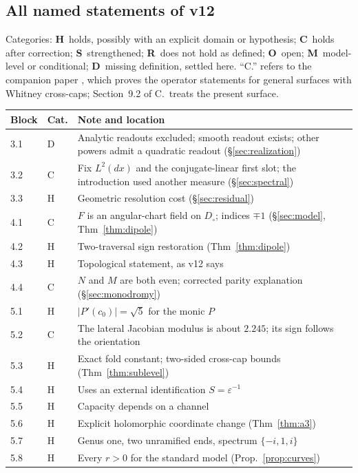 \documentclass[11pt]{article}
\theoremstyle{definition}\newtheorem{definition}[theorem]{Definition}
\theoremstyle{remark}\newtheorem{remark}[theorem]{Remark}
\begin{document}
\subsection{All named statements of v12}
Categories: \textbf{H}~holds, possibly with an explicit domain or hypothesis;
\textbf{C}~holds after correction; \textbf{S}~strengthened; \textbf{R}~does
not hold as defined; \textbf{O}~open; \textbf{M}~model-level or conditional;
\textbf{D}~missing definition, settled here. ``C.'' refers to the companion
paper \cite{companion}, which proves the operator statements for general
surfaces with Whitney cross-caps; Section~9.2 of C.\ treats the present surface.
{\small
\begin{longtable}{@{}l>{\raggedright\arraybackslash}p{.06\linewidth}>{\raggedright\arraybackslash}p{.72\linewidth}@{}}
\toprule Block & Cat. & Note and location\\\midrule\endhead
3.1 & D & Analytic readouts excluded; smooth readout exists; other powers admit a quadratic readout (\S\ref{sec:realization})\\
3.2 & C & Fix $L^2(dx)$ and the conjugate-linear first slot; the introduction used another measure (\S\ref{sec:spectral})\\
3.3 & H & Geometric resolution cost (\S\ref{sec:residual})\\
4.1 & C & $F$ is an angular-chart field on $D_\circ$; indices $\mp1$ (\S\ref{sec:model}, Thm~\ref{thm:dipole})\\
4.2 & H & Two-traversal sign restoration (Thm~\ref{thm:dipole})\\
4.3 & H & Topological statement, as v12 says\\
4.4 & C & $N$ and $M$ are both even; corrected parity explanation (\S\ref{sec:monodromy})\\
5.1 & H & $|P'(c_0)|=\sqrt5$ for the monic $P$\\
5.2 & C & The lateral Jacobian modulus is about $2.245$; its sign follows the orientation\\
5.3 & H & Exact fold constant; two-sided cross-cap bounds (Thm~\ref{thm:sublevel})\\
5.4 & H & Uses an external identification $S=\varepsilon^{-1}$\\
5.5 & H & Capacity depends on a channel\\
5.6 & H & Explicit holomorphic coordinate change (Thm~\ref{thm:a3})\\
5.7 & H & Genus one, two unramified ends, spectrum $\{-i,1,i\}$\\
5.8 & H & Every $r>0$ for the standard model (Prop.~\ref{prop:curves})\\

\end{longtable}}
\end{document}

